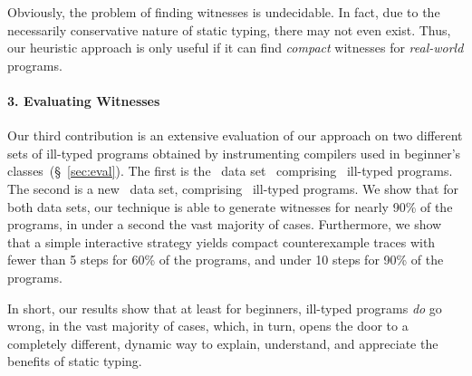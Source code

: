 
Obviously, the problem of finding witnesses is undecidable.
In fact, due to the necessarily conservative nature of static
typing, there may not even exist. Thus, our heuristic approach
is only useful if it can find \emph{compact} witnesses for
\emph{real-world} programs.

\paragraph{3. Evaluating Witnesses}
%
Our third contribution is an extensive evaluation of our approach
on two different sets of ill-typed programs obtained by instrumenting
compilers used in beginner's classes~(\S~\ref{sec:eval}).
%
The first is the \uwbench\ data set~\cite{lerner_searching_2007}
comprising \uwsize\ ill-typed programs.
%
The second is a new \ucsdbench\ data set, comprising \ucsdsize\
ill-typed programs.
%
We show that for both data sets, our technique is able to generate
witnesses for nearly 90\% of the programs, in under a second the
vast majority of cases.
%
Furthermore, we show that a simple interactive strategy yields
compact counterexample traces with fewer than 5 steps for 60\%
of the programs, and under 10 steps for 90\% of the programs.

In short, our results show that at least for beginners, ill-typed
programs \emph{do} go wrong, in the vast majority of cases, which,
in turn, opens the door to a completely different, dynamic way
to explain, understand, and appreciate the benefits of static typing.



%


